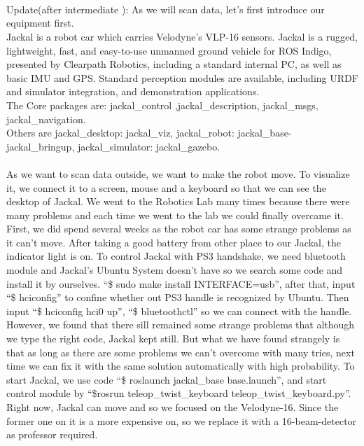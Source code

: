 \documentclass{article}
\begin{document}
\begin{normalsize}
         ~\\
         ~\\
         \\
         Update(after intermediate ): As we will scan data, let’s first introduce our equipment first.\\
         Jackal is a robot car which carries Velodyne’s VLP-16 sensors. Jackal is a rugged, lightweight, fast, and easy-to-use unmanned ground vehicle for ROS Indigo, presented by Clearpath Robotics, including a standard internal PC, as well as basic IMU and GPS. Standard perception modules are available, including URDF and simulator integration, and demonstration applications. \\
         The Core packages are: jackal\_control ,jackal\_description, jackal\_msgs, jackal\_navigation.\\
         Others are jackal\_desktop: jackal\_viz, jackal\_robot: jackal\_base-jackal\_bringup, jackal\_simulator: jackal\_gazebo.\\
         ~\\
         As we want to scan data outside, we want to make the robot move. To visualize it, we connect it to a screen, mouse and a keyboard so that we can see the desktop of Jackal. We went to the Robotics Lab many times because there were many problems and each time we went to the lab we could finally overcame it. First, we did spend several weeks as the robot car has some strange problems as it can’t move. After taking a good battery from other place to our Jackal, the indicator light is on. To control Jackal with PS3 handshake, we need bluetooth module and Jackal’s Ubuntu System doesn’t have so we search some code and install it by ourselves. “\$ sudo make install INTERFACE=usb”, after that, input “\$ hciconfig” to confine whether out PS3 handle is recognized by Ubuntu. Then input “\$ hciconfig hci0 up”, “\$ bluetoothctl” so we can connect with the handle. However, we found that there sill remained some strange problems that although we type the right code, Jackal kept still. But what we have found strangely is that as long as there are some problems we can’t overcome with many tries, next time we can fix it with the same solution automatically with high probability.  To start Jackal, we use code “\$ roslaunch jackal\_base  base.launch”, and start control module by “\$rosrun teleop\_twist\_keyboard teleop\_twist\_keyboard.py”. Right now, Jackal can move and so we focused on the Velodyne-16. Since the former one on it is a more expensive on, so we replace it with a 16-beam-detector as professor required. \\

\end{normalsize}
\end{document}

